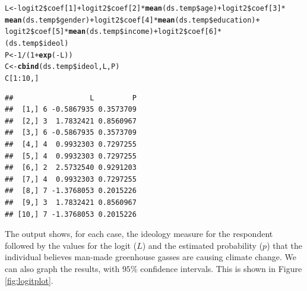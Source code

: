 \documentclass[11pt,openany]{book}\usepackage[]{graphicx}\usepackage[]{color}
\makeatletter
\newcommand{\hlnum}[1]{\textcolor[rgb]{0.686,0.059,0.569}{#1}}%
\newcommand{\hlopt}[1]{\textcolor[rgb]{0,0,0}{#1}}%
\newcommand{\hlstd}[1]{\textcolor[rgb]{0.345,0.345,0.345}{#1}}%
\newcommand{\hlkwb}[1]{\textcolor[rgb]{0.69,0.353,0.396}{#1}}%
\newcommand{\hlkwd}[1]{\textcolor[rgb]{0.737,0.353,0.396}{\textbf{#1}}}%
\newenvironment{kframe}{%
 \def\at@end@of@kframe{}%
 \ifinner\ifhmode%
  \def\at@end@of@kframe{\end{minipage}}%
  \begin{minipage}{\columnwidth}%
 \fi\fi%
 \def\FrameCommand##1{\hskip\@totalleftmargin \hskip-\fboxsep
 \colorbox{shadecolor}{##1}\hskip-\fboxsep
     \hskip-\linewidth \hskip-\@totalleftmargin \hskip\columnwidth}%
 \MakeFramed {\advance\hsize-\width
   \@totalleftmargin\z@ \linewidth\hsize
   \@setminipage}}%
 {\par\unskip\endMakeFramed%
 \at@end@of@kframe}
\newenvironment{knitrout}{}{} %
\renewenvironment{knitrout}{\begin{singlespace}}{\end{singlespace}}
\makeatother
\begin{document}
\begin{knitrout}
\color{fgcolor}\begin{kframe}
\begin{alltt}
\hlstd{L} \hlkwb{<-} \hlstd{logit2}\hlopt{\$}\hlstd{coef[}\hlnum{1}\hlstd{]} \hlopt{+} \hlstd{logit2}\hlopt{\$}\hlstd{coef[}\hlnum{2}\hlstd{]} \hlopt{*} \hlkwd{mean}\hlstd{(ds.temp}\hlopt{\$}\hlstd{age)} \hlopt{+} \hlstd{logit2}\hlopt{\$}\hlstd{coef[}\hlnum{3}\hlstd{]} \hlopt{*}
    \hlkwd{mean}\hlstd{(ds.temp}\hlopt{\$}\hlstd{gender)} \hlopt{+} \hlstd{logit2}\hlopt{\$}\hlstd{coef[}\hlnum{4}\hlstd{]} \hlopt{*} \hlkwd{mean}\hlstd{(ds.temp}\hlopt{\$}\hlstd{education)} \hlopt{+}
    \hlstd{logit2}\hlopt{\$}\hlstd{coef[}\hlnum{5}\hlstd{]} \hlopt{*} \hlkwd{mean}\hlstd{(ds.temp}\hlopt{\$}\hlstd{income)} \hlopt{+} \hlstd{logit2}\hlopt{\$}\hlstd{coef[}\hlnum{6}\hlstd{]} \hlopt{*}
    \hlstd{(ds.temp}\hlopt{\$}\hlstd{ideol)}
\hlstd{P} \hlkwb{<-} \hlnum{1}\hlopt{/}\hlstd{(}\hlnum{1} \hlopt{+} \hlkwd{exp}\hlstd{(}\hlopt{-}\hlstd{L))}
\hlstd{C} \hlkwb{<-} \hlkwd{cbind}\hlstd{(ds.temp}\hlopt{\$}\hlstd{ideol, L, P)}
\hlstd{C[}\hlnum{1}\hlopt{:}\hlnum{10}\hlstd{, ]}
\end{alltt}
\begin{verbatim}
##                  L         P
##  [1,] 6 -0.5867935 0.3573709
##  [2,] 3  1.7832421 0.8560967
##  [3,] 6 -0.5867935 0.3573709
##  [4,] 4  0.9932303 0.7297255
##  [5,] 4  0.9932303 0.7297255
##  [6,] 2  2.5732540 0.9291203
##  [7,] 4  0.9932303 0.7297255
##  [8,] 7 -1.3768053 0.2015226
##  [9,] 3  1.7832421 0.8560967
## [10,] 7 -1.3768053 0.2015226
\end{verbatim}
\end{kframe}
\end{knitrout}

The output shows, for each case, the ideology measure for the respondent followed by the values for the logit ($L$) and the estimated probability ($p$) that the individual believes man-made greenhouse gasses are causing climate change.  We can also graph the results, with $95\%$ confidence intervals. This is shown in Figure \ref{fig:logitplot}.
\end{document}

